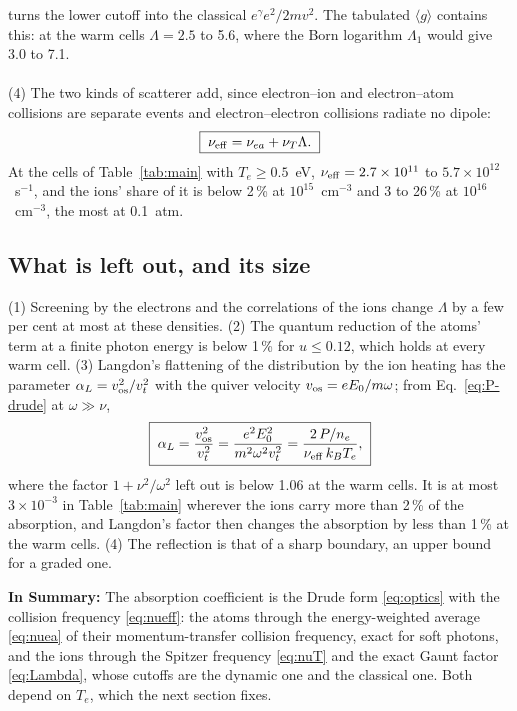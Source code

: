\documentclass[11pt]{article}
\numberwithin{equation}{section}
\newcommand{\nuT}{\nu_T}
\newcommand{\nueff}{\nu_{\rm eff}}
\newcommand{\nuea}{\nu_{ea}}
\newcommand{\vt}{v_t}
\newcommand{\kB}{k_B}
\newcommand{\Te}{T_e}
\begin{document}
turns the lower cutoff into the classical $e^\gamma e^2/2mv^2$. The tabulated
$\langle g\rangle$ contains this: at the warm cells $\Lambda=2.5$ to 5.6, where the Born
logarithm $\Lambda_1$ would give 3.0 to 7.1.
\\ \\
{\noindent}(4) The two kinds of scatterer add, since electron--ion and electron--atom
collisions are separate events and electron--electron collisions radiate no dipole:
\begin{equation}
\boxed{\;\nueff=\nuea+\nuT\Lambda.\;}
\label{eq:nueff}
\end{equation}
At the cells of Table~\ref{tab:main} with $\Te\ge0.5$~eV, $\nueff=2.7\times10^{11}$ to
$5.7\times10^{12}$~s$^{-1}$, and the ions' share of it is below 2\,\% at $10^{15}$~cm$^{-3}$
and 3 to 26\,\% at $10^{16}$~cm$^{-3}$, the most at 0.1~atm.

\subsection{What is left out, and its size}
\label{sec:leftout}
{\noindent}(1) Screening by the electrons and the correlations of the ions change
$\Lambda$ by a few per cent at most at these densities. (2) The quantum reduction of the
atoms' term at a finite photon energy is below 1\,\% for $u\le0.12$, which holds at every
warm cell. (3) Langdon's flattening of the distribution by the ion heating has the
parameter $\alpha_L=v_{\rm os}^2/\vt^2$ with the quiver velocity $v_{\rm os}=eE_0/m\omega$;
from Eq.~\eqref{eq:P-drude} at $\omega\gg\nu$,
\begin{equation}
\boxed{\;\alpha_L=\frac{v_{\rm os}^2}{\vt^2}=\frac{e^2E_0^2}{m^2\omega^2\vt^2}
=\frac{2\,P/n_e}{\nueff\,\kB\Te},\;}
\label{eq:alphaL}
\end{equation}
where the factor $1+\nu^2/\omega^2$ left out is below 1.06 at the warm cells. It is at most $3\times10^{-3}$ in
Table~\ref{tab:main} wherever the ions carry more than 2\,\% of the absorption, and Langdon's factor \cite{Langdon1980} then changes the
absorption by less than 1\,\% at the warm cells. (4) The reflection is that of a sharp
boundary, an upper bound for a graded one.

\medskip
\noindent\textbf{In Summary:} The absorption coefficient is the Drude form
\eqref{eq:optics} with the collision frequency \eqref{eq:nueff}: the atoms through the
energy-weighted average \eqref{eq:nuea} of their momentum-transfer collision frequency,
exact for soft photons, and the ions through the Spitzer frequency \eqref{eq:nuT} and
the exact Gaunt factor \eqref{eq:Lambda}, whose cutoffs are the dynamic one and the
classical one. Both depend on $\Te$, which the next section fixes.
\end{document}
